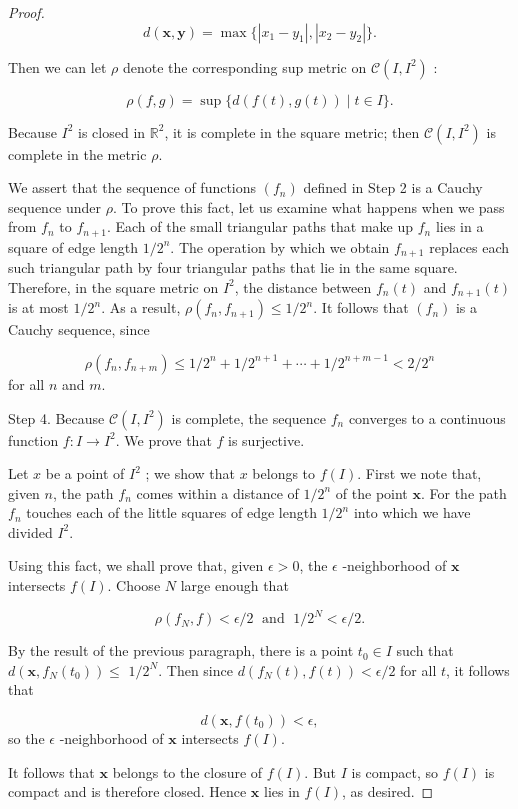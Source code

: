 \begin{proof}
\[
d({\mathbf{x},\mathbf{y}}) = \max \{ {| {x_{1} - y_{1}}| ,| {x_{2} - y_{2}}| }\}.
\]

Then we can let \(\rho\) denote the corresponding sup metric on \(\mathcal{C}({I,I^{2}})\) :

\[
\rho ({f,g}) = \sup \{ d({f( t),g( t) }) \mid t \in I\}.
\]

Because \(I^{2}\) is closed in \(\mathbb{R}^{2}\), it is complete in the square metric; then \(\mathcal{C}({I,I^{2}})\) is complete in the metric \(\rho\).

We assert that the sequence of functions \((f_{n})\) defined in Step 2 is a Cauchy sequence under \(\rho\). To prove this fact, let us examine what happens when we pass from \(f_{n}\) to \(f_{n + 1}\). Each of the small triangular paths that make up \(f_{n}\) lies in a square of edge length \(1/2^{n}\). The operation by which we obtain \(f_{n + 1}\) replaces each such triangular path by four triangular paths that lie in the same square. Therefore, in the square metric on \(I^{2}\), the distance between \(f_{n}( t)\) and \(f_{n + 1}( t)\) is at most \(1/2^{n}\). As a result, \(\rho ({f_{n},f_{n + 1}}) \leq 1/2^{n}\). It follows that \((f_{n})\) is a Cauchy sequence, since

\[
\rho ({f_{n},f_{n + m}}) \leq 1/2^{n} + 1/2^{n + 1} + \cdots + 1/2^{n + m - 1} < 2/2^{n}
\]
for all \(n\) and \(m\).

Step 4. Because \(\mathcal{C}({I,I^{2}})\) is complete, the sequence \(f_{n}\) converges to a continuous function \(f : I \rightarrow {I}^{2}\). We prove that \(f\) is surjective.

Let \(x\) be a point of \(I^{2}\) ; we show that \(x\) belongs to \(f(I)\). First we note that, given \(n\), the path \(f_{n}\) comes within a distance of \(1/2^{n}\) of the point \(\mathbf{x}\). For the path \(f_{n}\) touches each of the little squares of edge length \(1/2^{n}\) into which we have divided \(I^{2}\).

Using this fact, we shall prove that, given \(\epsilon > 0\), the \(\epsilon\) -neighborhood of \(\mathbf{x}\) intersects \(f(I)\). Choose \(N\) large enough that

\[
\rho ({f_{N},f}) < \epsilon /2\;\text{ and }\;1/2^{N} < \epsilon /2.
\]

By the result of the previous paragraph, there is a point \(t_{0} \in I\) such that \(d({\mathbf{x},f_{N}(t_{0}) }) \leq\) \(1/2^{N}\). Then since \(d({f_{N}( t),f( t) }) < \epsilon /2\) for all \(t\), it follows that

\[
d({\mathbf{x},f(t_{0}) }) < \epsilon ,
\]
so the \(\epsilon\) -neighborhood of \(\mathbf{x}\) intersects \(f(I)\).

It follows that \(\mathbf{x}\) belongs to the closure of \(f(I)\). But \(I\) is compact, so \(f(I)\) is compact and is therefore closed. Hence \(\mathbf{x}\) lies in \(f(I)\), as desired.
\end{proof}
